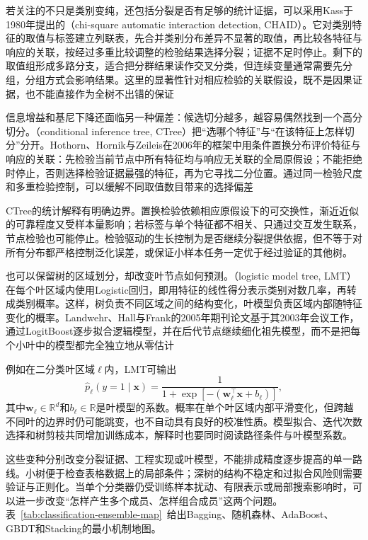 若关注的不只是类别变纯，还包括分裂是否有足够的统计证据，可以采用Kass于1980年提出的（chi-square automatic interaction detection, CHAID）。它对类别特征的取值与标签建立列联表，先合并类别分布差异不显著的取值，再比较各特征与响应的关联，按经过多重比较调整的检验结果选择分裂；证据不足时停止。剩下的取值组形成多路分支，适合把分群结果读作交叉分类，但连续变量通常需要先分组，分组方式会影响结果。这里的显著性针对相应检验的关联假设，既不是因果证据，也不能直接作为全树不出错的保证

信息增益和基尼下降还面临另一种偏差：候选切分越多，越容易偶然找到一个高分切分。（conditional inference tree, CTree）把“选哪个特征”与“在该特征上怎样切分”分开。Hothorn、Hornik与Zeileis在2006年的框架中用条件置换分布评价特征与响应的关联：先检验当前节点中所有特征均与响应无关联的全局原假设；不能拒绝时停止，否则选择检验证据最强的特征，再为它寻找二分位置。通过同一检验尺度和多重检验控制，可以缓解不同取值数目带来的选择偏差

CTree的统计解释有明确边界。置换检验依赖相应原假设下的可交换性，渐近近似的可靠程度又受样本量影响；若标签与单个特征都不相关、只通过交互发生联系，节点检验也可能停止。检验驱动的生长控制为是否继续分裂提供依据，但不等于对所有分布都严格控制泛化误差，或保证小样本任务一定优于经过验证的其他树。

也可以保留树的区域划分，却改变叶节点如何预测。（logistic model tree, LMT）在每个叶区域内使用Logistic回归，即用特征的线性得分表示类别对数几率，再转成类别概率。这样，树负责不同区域之间的结构变化，叶模型负责区域内部随特征变化的概率。Landwehr、Hall与Frank的2005年期刊论文基于其2003年会议工作，通过LogitBoost逐步拟合逻辑模型，并在后代节点继续细化祖先模型，而不是把每个小叶中的模型都完全独立地从零估计

例如在二分类叶区域$\ell$内，LMT可输出
\begin{equation}
  \hat p_\ell(y=1\mid\bm{x})
  =\frac{1}{1+\exp[-(\bm{w}_\ell^\top\bm{x}+b_\ell)]},
  \label{eq:classification-lmt-leaf}
\end{equation}
其中$\bm{w}_\ell\in\mathbb{R}^d$和$b_\ell\in\mathbb{R}$是叶模型的系数。概率在单个叶区域内部平滑变化，但跨越不同叶的边界时仍可能跳变，也不自动具有良好的校准性质。模型拟合、迭代次数选择和树剪枝共同增加训练成本，解释时也要同时阅读路径条件与叶模型系数。

这些变种分别改变分裂证据、工程实现或叶模型，不能排成精度逐步提高的单一路线。小树便于检查表格数据上的局部条件；深树的结构不稳定和过拟合风险则需要验证与正则化。当单个分类器仍受训练样本扰动、有限表示或局部搜索影响时，可以进一步改变“怎样产生多个成员、怎样组合成员”这两个问题。表~\ref{tab:classification-ensemble-map}~给出Bagging、随机森林、AdaBoost、GBDT和Stacking的最小机制地图。


